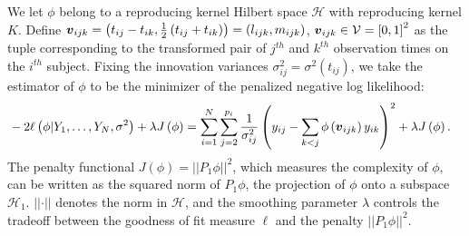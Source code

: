 \documentclass[12pt]{article}
\newcommand{\hilbert}{\mathcal{H}}
\newcommand{\argmin}[1]{\underset{#1}{\operatorname{arg}\,\operatorname{min}}\;}
\newcommand{\bfv}{\mbox{\boldmath $v$}}
\begin{document}
We let $\phi$ belong to a reproducing kernel Hilbert space $\hilbert$ with reproducing kernel $K$. Define $\bfv_{ijk} = \left(t_{ij} - t_{ik}, \frac{1}{2}\left(t_{ij} + t_{ik}\right)\right) = \left(l_{ijk}, m_{ijk}\right)$, $\bfv_{ijk} \in \mathcal{V} = \left[0,1\right]^2$ as the tuple corresponding to the transformed pair of $j^{th}$ and $k^{th}$ observation times on the $i^{th}$ subject. Fixing the innovation variances $\sigma_{ij}^2 = \sigma^2\left(t_{ij}\right)$, we take the estimator of $\phi$ to be the minimizer of the penalized negative log likelihood:%
\begin{align}
\label{eq:phi-penalized-log-likelihood}
&-2\ell\left(\phi \vert Y_1,\dots, Y_N, \sigma^2\right) +  \lambda J\left(\phi\right) =  \sum_{i=1}^N \sum_{j=2}^{p_i} \frac{1}{\sigma^{2}_{ij}}\left( y_{ij} - \sum_{k<j} \phi\left(\bfv_{ijk}\right) y_{ik}  \right)^2 + \lambda J\left(\phi\right).
\end{align}
\noindent
The penalty functional $J\left(\phi\right) = \vert \vert P_1 \phi\vert \vert^2$, which measures the complexity of $\phi$, can be written as the squared norm of $P_1 \phi$, the projection of $\phi$ onto a subspace $\hilbert_1$.  $\vert \vert \cdot \vert \vert$ denotes the norm in $\hilbert$, and the smoothing parameter $\lambda$ controls the tradeoff between the goodness of fit measure $\ell$ and the penalty $\vert \vert P_1 \phi\vert \vert^2$.
\end{document}
